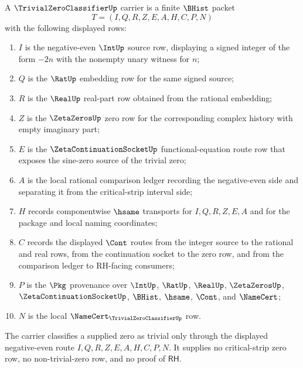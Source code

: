 \begin{definition}
\label{def:trivial-zero-classifier-carrier}
A $\TrivialZeroClassifierUp$ carrier is a finite $\BHist$ packet
$$
T=(I,Q,R,Z,E,A,H,C,P,N)
$$
with the following displayed rows:
\begin{enumerate}
\item $I$ is the negative-even $\IntUp$ source row, displaying a signed integer of the form $-2n$ with the nonempty unary witness for $n$;
\item $Q$ is the $\RatUp$ embedding row for the same signed source;
\item $R$ is the $\RealUp$ real-part row obtained from the rational embedding;
\item $Z$ is the $\ZetaZerosUp$ zero row for the corresponding complex history with empty imaginary part;
\item $E$ is the $\ZetaContinuationSocketUp$ functional-equation route row that exposes the sine-zero source of the trivial zero;
\item $A$ is the local rational comparison ledger recording the negative-even side and separating it from the critical-strip interval side;
\item $H$ records componentwise $\hsame$ transports for $I,Q,R,Z,E,A$ and for the package and local naming coordinates;
\item $C$ records the displayed $\Cont$ routes from the integer source to the rational and real rows, from the continuation socket to the zero row, and from the comparison ledger to RH-facing consumers;
\item $P$ is the $\Pkg$ provenance over $\IntUp$, $\RatUp$, $\RealUp$, $\ZetaZerosUp$, $\ZetaContinuationSocketUp$, $\BHist$, $\hsame$, $\Cont$, and $\NameCert$;
\item $N$ is the local $\NameCert_{\TrivialZeroClassifierUp}$ row.
\end{enumerate}
The carrier classifies a supplied zero as trivial only through the displayed negative-even route $I,Q,R,Z,E,A,H,C,P,N$. It supplies no critical-strip zero row, no non-trivial-zero row, and no proof of $\mathsf{RH}$.
\end{definition}

